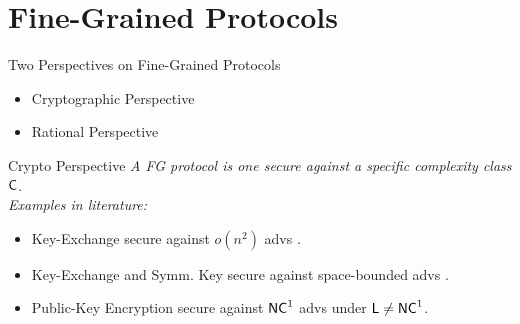 \section{Fine-Grained Protocols}

\begin{frame}{Two Perspectives on Fine-Grained Protocols}
	
	\begin{itemize}
		\item Cryptographic Perspective
		\item  Rational Perspective
	\end{itemize}
\end{frame}

\begin{frame}[t]{Crypto Perspective}
	\textit{A FG protocol is one secure against a specific complexity class ${\mathsf{C}}$}.\pause\\
	\bigskip
\textit{Examples in literature:}
	\begin{itemize}
		\item Key-Exchange secure against $o(n^2)$ advs \cite{merkle}. \pause
		\item Key-Exchange and Symm. Key secure against space-bounded advs \cite{maurer}.\pause 
		\item Public-Key Encryption secure against ${\mathsf{NC}}^1$ advs \cite{fgcrypto} under ${\mathsf{L}} \not = {\mathsf{NC}}^1$.
	\end{itemize}
\end{frame}

